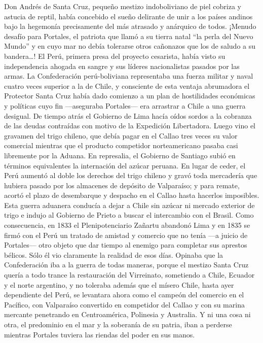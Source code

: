 \documentclass[10pt,twoside,openright]{memoir}
\begin{document}
Don Andrés de Santa Cruz, pequeño mestizo indoboliviano de piel cobriza
y astucia de reptil, había concebido el sueño delirante de unir a los
países andinos bajo la hegemonía precisamente del más atrasado y
anárquico de todos. ¡Menudo desafío para Portales, el patriota que llamó
a su tierra natal ``la perla del Nuevo Mundo'' y en cuyo mar no debía
tolerarse otros cañonazos que los de saludo a su bandera\ldots! El Perú,
primera presa del proyecto cesarista, había visto su independencia
ahogada en sangre y sus líderes nacionalistas pasados por las armas. La
Confederación perú-boliviana representaba una fuerza militar y naval
cuatro veces superior a la de Chile, y consciente de esta ventaja
abrumadora el Protector Santa Cruz había dado comienzo a un plan de
hostilidades económicas y políticas cuyo fin ---aseguraba Portales---
era arrastrar a Chile a una guerra desigual. De tiempo atrás el Gobierno
de Lima hacía oídos sordos a la
cobranza de las deudas contraídas con motivo de la Expedición
Libertadora. Luego vino el gravamen del trigo chileno, que debía pagar
en el Callao tres veces su valor comercial mientras que el producto
competidor norteamericano pasaba casi libremente por la Aduana. En
represalia, el Gobierno de Santiago subió en términos equivalentes la
internación del azúcar peruana. En lugar de ceder, el Perú aumentó al
doble los derechos del trigo chileno y gravó toda mercadería que hubiera
pasado por los almacenes de depósito de Valparaíso; y para remate,
acortó el plazo de desembarque y despacho en el Callao hasta hacerlos
imposibles. Esta guerra aduanera conducía a dejar a Chile sin azúcar ni
mercado exterior de trigo e indujo al Gobierno de Prieto a buscar el
intercambio con el Brasil. Como consecuencia, en 1833 el
Plenipotenciario Zañartu abandonó Lima y en 1835 se firmó con el Perú un
tratado de amistad y comercio que no tenía ---a juicio de Portales---
otro objeto que dar tiempo al enemigo para completar sus aprestos
bélicos. Sólo él vio claramente la realidad de esos días. Opinaba que la
Confederación iba a la guerra de todas maneras, porque el mestizo Santa
Cruz quería a todo trance la restauración del Virreinato, sometiendo a
Chile, Ecuador y el norte argentino, y no toleraba además que el mísero
Chile, hasta ayer dependiente del Perú, se levantara ahora como el
campeón del comercio en el Pacífico, con Valparaíso convertido en
competidor del Callao y con su marina mercante penetrando en
Centroamérica, Polinesia y Australia. Y ni una cosa ni otra, el
predominio en el mar y la soberanía de su patria, iban a perderse
mientras Portales tuviera las riendas del poder en sus manos.
\end{document}
